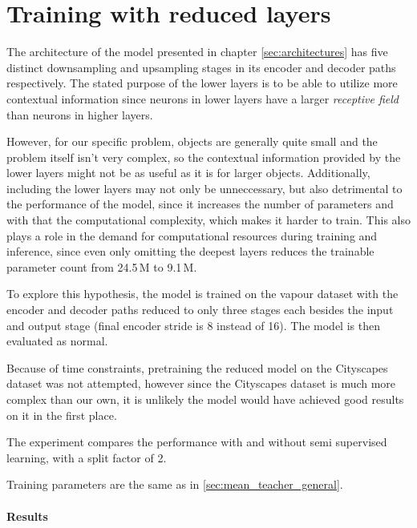 \section{Training with reduced layers}
\label{sec:reduced_layers}

The architecture of the model presented in chapter \ref{sec:architectures} has five distinct downsampling and upsampling stages in its encoder and decoder paths respectively.
The stated purpose of the lower layers is to be able to utilize more contextual information since neurons in lower layers have a larger \emph{receptive field} than neurons in higher layers.

However, for our specific problem, objects are generally quite small  and the problem itself isn't very complex, so the contextual information provided by the lower layers might not be as useful as it is for larger objects.
Additionally, including the lower layers may not only be unneccessary, but also detrimental to the performance of the model, since it increases the number of parameters and with that the computational complexity, which makes it harder to train. 
This also plays a role in the demand for computational resources during training and inference, since even only omitting the deepest layers reduces the trainable parameter count from 24.5\,M to 9.1\,M.

To explore this hypothesis, the model is trained on the vapour dataset with the encoder and decoder paths reduced to only three stages each besides the input and output stage (final encoder stride is 8 instead of 16). The model is then evaluated as normal.

Because of time constraints, pretraining the reduced model on the Cityscapes dataset was not attempted, however since the Cityscapes dataset is much more complex than our own, it is unlikely the model would have achieved good results on it in the first place.

The experiment compares the performance with and without semi supervised learning, with a split factor of 2.

Training parameters are the same as in \ref{sec:mean_teacher_general}.

\paragraph{Results}